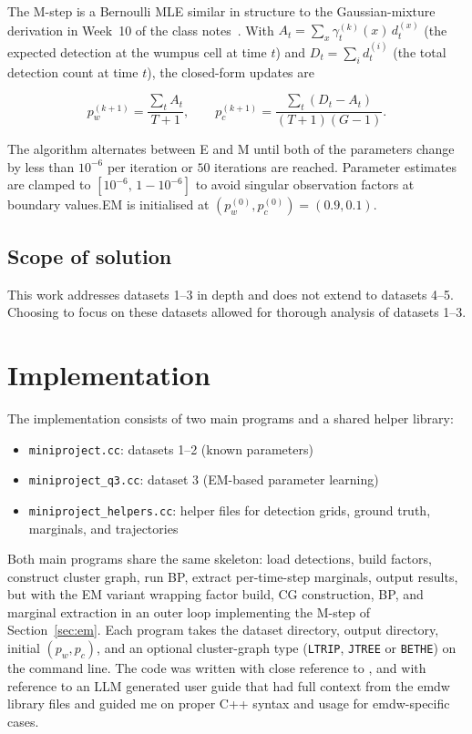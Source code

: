\documentclass[11pt, a4paper]{article}
\begin{document}
The M-step is a Bernoulli MLE similar in structure to the
Gaussian-mixture derivation in Week~10 of the class
notes~\cite[Week~10]{dupreez2026de424}. With
$A_t = \sum_x \gamma_t^{(k)}(x)\, d_t^{(x)}$ (the expected
detection at the wumpus cell at time $t$) and
$D_t = \sum_i d_t^{(i)}$ (the total detection count at time $t$),
the closed-form updates are


\begin{equation*}
p_w^{(k+1)} = \frac{\sum_t A_t}{T+1},
\qquad
p_c^{(k+1)} = \frac{\sum_t (D_t - A_t)}{(T+1)(G-1)}.
\label{eq:mstep}
\end{equation*}

\noindent The algorithm alternates between E and M until
both of the parameters change by less than $10^{-6}$ per iteration or $50$ iterations are reached. Parameter estimates are clamped to
$[10^{-6},\, 1{-}10^{-6}]$ to avoid singular observation factors at boundary
values.EM is initialised at $(p_w^{(0)}, p_c^{(0)}) = (0.9, 0.1)$.

\subsection{Scope of solution}
\label{sec:scope}

This work
addresses datasets 1--3 in depth and does not extend to datasets 4--5.
Choosing to focus on these datasets allowed for thorough analysis of datasets 1--3. 

\section{Implementation}
\label{sec:impl}

The implementation consists of two main programs and a shared helper library:
\begin{itemize}
\item \texttt{miniproject.cc}: datasets 1--2 (known parameters)
\item \texttt{miniproject\_q3.cc}: dataset 3 (EM-based parameter learning)
\item \texttt{miniproject\_helpers.cc}: helper files for detection grids, ground
truth, marginals, and trajectories
\end{itemize}
Both main programs share the same skeleton: load detections, build
factors, construct cluster graph, run BP, extract per-time-step marginals,
output results, but with the EM variant wrapping factor build, CG
construction, BP, and marginal extraction in an outer loop implementing the
M-step of Section~\ref{sec:em}. Each program takes the dataset directory,
output directory, initial $(p_w, p_c)$, and an optional cluster-graph type
(\texttt{LTRIP}, \texttt{JTREE} or \texttt{BETHE}) on the command line. The code was
written with close reference to \cite{emdw_userguide}, and with reference to an LLM generated user guide 
that had full context from the emdw library files and guided me on proper C++ syntax and usage for emdw-specific
cases.
\end{document}
